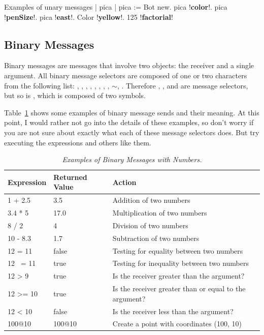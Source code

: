 \documentclass[a4paper,10pt,twoside]{book}
\begin{document}
\begin{script}[unaryex]{Examples of unary messages}
| pica | 
pica := Bot new. 
pica !\textbf{color}!. 
pica !\textbf{penSize}!. 
pica !\textbf{east}!. 
Color !\textbf{yellow}!. 
125 !\textbf{factorial}!
\end{script}






\subsection{Binary Messages}

Binary messages are messages that involve two objects: the receiver and a single argument. All 
binary message selectors are composed of one or two characters from the following list: 
\ct{+}, 
\ct{*},
\ct{/}, 
\ct{|},
\ct{&},
\ct{=},
\ct{>},
\ct{<},
\textsf{$\sim$},
. Therefore \ct{+}, \ct{=}, and \ct{*} are message selectors, but so is \ct{=>}, which is composed of two symbols. 

Table~\ref{tab1102} shows some examples of binary message sends and their meaning. At this 
point, I would rather not go into the details of these examples, so don’t worry if you are not 
sure about exactly what each of these message selectors does. But try executing the expressions and others like them. 


\begin{table}[h]
 \caption{\emph{Examples of Binary Messages with Numbers.}\label{tab1102}}
 \begin{center}
 {\small \begin{tabular}{p{23mm}p{28mm}p{50mm}}
 \hline
 \textbf{Expression} & \textbf{Returned Value} & \textbf{Action}\\ \hline
\textsf{1 + 2.5}& \textsf{3.5}& Addition of two numbers \\ 
\textsf{3.4 * 5}& \textsf{17.0}& Multiplication of two numbers \\ 
\textsf{8 / 2}& \textsf{4}& Division of two numbers \\ 
\textsf{10 - 8.3}& \textsf{1.7}& Subtraction of two numbers \\ 
\textsf{12 = 11}& \textsf{false}& Testing for equality between two numbers \\ 
\textsf{12 ~= 11}& \textsf{true}& Testing for inequality between two numbers \\ 
\textsf{12 > 9}& \textsf{true}& Is the receiver greater than the argument? \\ 
\textsf{12 >= 10}& \textsf{true}& Is the receiver greater than or equal to the argument? \\ 
\textsf{12 < 10}& \textsf{false}& Is the receiver less than the argument? \\ 
\textsf{100@10}& \textsf{100@10}& Create a point with coordinates (100, 10)\\ 
 \hline
 \end{tabular}}
 \end{center}
 \end{table}
\end{document}
